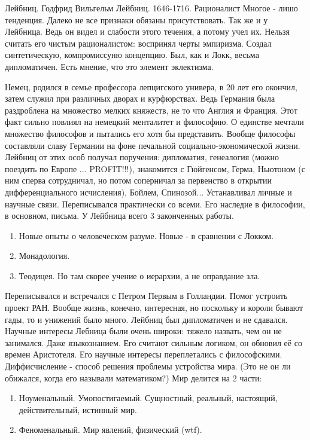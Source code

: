 Лейбниц. Годфрид Вильгельм Лейбниц. 1646-1716. Рационалист
Многое - лишо тенденция. Далеко не все признаки обязаны присутствовать. Так же и у Лейбница. Ведь он видел и слабости этого течения, а потому учел их. Нельзя считать его чистым рационалистом: воспринял черты эмпиризма. Создал синтетическую, компромиссуню концепцию. Был, как и Локк, весьма дипломатичен. Есть мнение, что это элемент эклектизма.

Немец, родился в семье профессора лепцигского универа, в 20 лет его окончил, затем служил при различных дворах и курфюрствах. Ведь Германия была раздроблена на множество мелких княжеств, не то что Англия и Франция. Этот факт сильно повлиял на немецкий менталитет и философию. О единстве мечтали множество философов и пытались его хотя бы представить. Вообще философы составляли славу Германии на фоне печальной социально-экономической жизни. Лейбниц от этих особ получал поручения: дипломатия, генеалогия (можно поездить по Европе ... PROFIT!!!), знакомится с Гюйгенсом, Герма, Ньютоном (с ним сперва сотрудничал, но потом соперничал за первенство в открытии дифференциального исчисления), Бойлем, Спинозой... Устанавливал личные и научные связи. Переписывался практически со всеми. Его наследие в философии, в основном, письма. У Лейбница всего 3 законченных работы.
\begin{enumerate}
	\item Новые опыты о человеческом разуме. Новые - в сравнении с Локком.
	\item Монадология.
	\item Теодицея. Но там скорее учение о иерархии, а не оправдание зла.
\end{enumerate}
	
Переписывался и встречался с Петром Первым в Голландии. Помог устроить проект РАН. Вообще жизнь, конечно, интересная, но поскольку и короли бывают гады, то и унижений было много. Лейбниц был дипломатичен и не сдавался.
Научные интересы Лебница были очень широки: тяжело назвать, чем он не занимался. Даже языкознанием. Его считают сильным логиком, он обновил её со времен Аристотеля. Его научные интересы переплетались с философскими. Диффисчисление - способ решения проблемы устройства мира. (Это не он ли обижался, когда его называли математиком?)
Мир делится на 2 части: 
\begin{enumerate}
	\item Ноуменальный. Умопостигаемый. Сущностный, реальный, настоящий, действительный, истинный мир.
	\item Феноменальный. Мир явлений, физический (wtf).
\end{enumerate}

